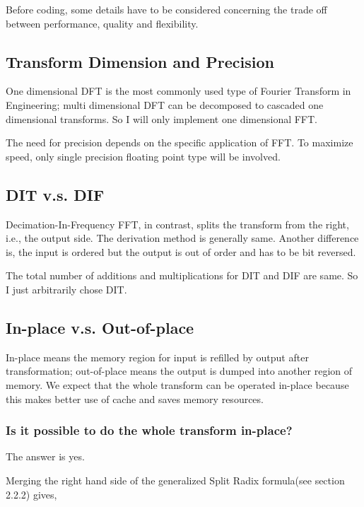 \documentclass[a4paper]{report}
\begin{document}
	Before coding, some details have to be considered concerning the trade off between performance, quality and flexibility.

\subsection{Transform Dimension and Precision} \indent

	One dimensional DFT is the most commonly used type of Fourier Transform in Engineering; multi dimensional DFT can be decomposed to cascaded one dimensional transforms. So I will only implement one dimensional FFT.
	
	The need for precision depends on the specific application of FFT. To maximize speed, only single precision floating point type will be involved.

\subsection{DIT v.s. DIF} \indent

	Decimation-In-Frequency FFT, in contrast, splits the transform from the right, i.e., the output side. The derivation method is generally same. Another difference is, the input is ordered but the output is out of order and has to be bit reversed.
	
	The total number of additions and multiplications for DIT and DIF are same. So I just arbitrarily chose DIT.

\subsection{In-place v.s. Out-of-place} \indent

	In-place means the memory region for input is refilled by output after transformation; out-of-place means the output is dumped into another region of memory. We expect that the whole transform can be operated in-place because this makes better use of cache and saves memory resources.
	
\subsubsection{Is it possible to do the whole transform in-place?} \indent

	The answer is yes.
	
	\bigskip
	
	Merging the right hand side of the generalized Split Radix formula(see section 2.2.2) gives,
	
\end{document}
